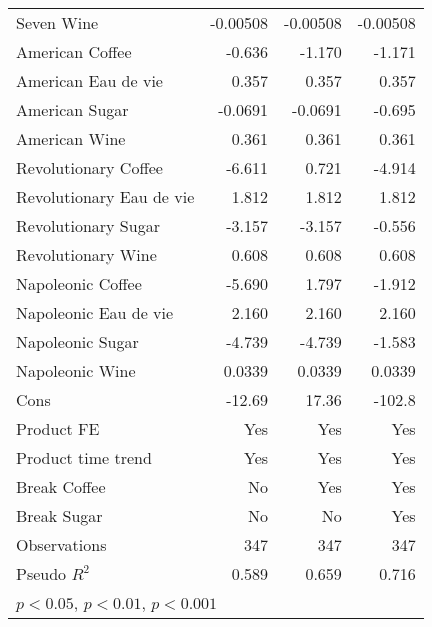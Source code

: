 \begin{table}[htbp]
\begin{tabular}{l*{3}{D{.}{.}{-1}}}
Seven Wine          &    -0.00508         &    -0.00508         &    -0.00508         \\
American Coffee     &      -0.636         &      -1.170\sym{***}&      -1.171\sym{***}\\
American Eau de vie &       0.357         &       0.357         &       0.357         \\
American Sugar      &     -0.0691         &     -0.0691         &      -0.695\sym{*}  \\
American Wine       &       0.361\sym{**} &       0.361\sym{**} &       0.361\sym{**} \\
Revolutionary Coffee&      -6.611\sym{***}&       0.721         &      -4.914         \\
Revolutionary Eau de vie&       1.812\sym{***}&       1.812\sym{***}&       1.812\sym{***}\\
Revolutionary Sugar &      -3.157\sym{***}&      -3.157\sym{***}&      -0.556         \\
Revolutionary Wine  &       0.608\sym{***}&       0.608\sym{***}&       0.608\sym{***}\\
Napoleonic Coffee   &      -5.690\sym{***}&       1.797         &      -1.912         \\
Napoleonic Eau de vie&       2.160\sym{***}&       2.160\sym{***}&       2.160\sym{***}\\
Napoleonic Sugar    &      -4.739\sym{***}&      -4.739\sym{***}&      -1.583         \\
Napoleonic Wine     &      0.0339         &      0.0339         &      0.0339         \\
Cons                &      -12.69         &       17.36         &      -102.8\sym{***}\\
Product FE          &         Yes         &         Yes         &         Yes         \\
Product time trend  &         Yes         &         Yes         &         Yes         \\
Break Coffee        &          No         &         Yes         &         Yes         \\
Break Sugar         &          No         &          No         &         Yes         \\
\hline
Observations        &         347         &         347         &         347         \\
Pseudo \(R^{2}\)    &       0.589         &       0.659         &       0.716         \\
\hline\hline
{}\\
\end{tabular}
\end{table}
